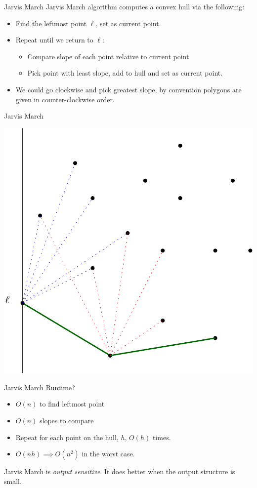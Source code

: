 \documentclass[aspectratio=169]{beamer}
\begin{document}
\begin{frame}{Jarvis March}
Jarvis March algorithm computes a convex hull via the following:
    \begin{itemize}
        \item Find the leftmost point $\ell$, set as current point. \pause
        \item Repeat until we return to $\ell$: \pause 
        \begin{itemize}
            \item Compare slope of each point relative to current point \pause 
            \item Pick point with least slope, add to hull and set as current point. \pause
        \end{itemize}
        \item We could go clockwise and pick greatest slope, by convention polygons are given in counter-clockwise order.
    \end{itemize}
\end{frame}

\begin{frame}{Jarvis March}
    \begin{center}
        \includegraphics[width=.60\textwidth]{jarvis.png}
    \end{center}
\end{frame}

\begin{frame}{Jarvis March}
    Runtime? \pause
    \begin{itemize}
        \item $O(n)$ to find leftmost point \pause
        \item $O(n)$ slopes to compare \pause 
        \item Repeat for each point on the hull, $h$, $O(h)$ times. \pause
        \item $O(nh) \implies O(n^2)$ in the worst case.
    \end{itemize}
    Jarvis March is \textit{output sensitive}. It does better when the output structure is small.
\end{frame}
\end{document}
